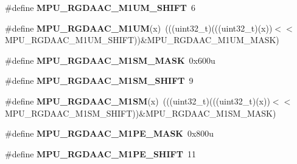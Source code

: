 \begin{DoxyCompactItemize}
\item 
\#define {\bfseries M\+P\+U\+\_\+\+R\+G\+D\+A\+A\+C\+\_\+\+M1\+U\+M\+\_\+\+S\+H\+I\+FT}~6\hypertarget{group__MPU__Register__Masks_gab78a3ecaa69ce9b7a985e4efa7b4620d}{}\label{group__MPU__Register__Masks_gab78a3ecaa69ce9b7a985e4efa7b4620d}

\item 
\#define {\bfseries M\+P\+U\+\_\+\+R\+G\+D\+A\+A\+C\+\_\+\+M1\+UM}(x)~(((uint32\+\_\+t)(((uint32\+\_\+t)(x))$<$$<$M\+P\+U\+\_\+\+R\+G\+D\+A\+A\+C\+\_\+\+M1\+U\+M\+\_\+\+S\+H\+I\+FT))\&M\+P\+U\+\_\+\+R\+G\+D\+A\+A\+C\+\_\+\+M1\+U\+M\+\_\+\+M\+A\+SK)\hypertarget{group__MPU__Register__Masks_ga0d79bb99181801ac26d748c60f15b7eb}{}\label{group__MPU__Register__Masks_ga0d79bb99181801ac26d748c60f15b7eb}

\item 
\#define {\bfseries M\+P\+U\+\_\+\+R\+G\+D\+A\+A\+C\+\_\+\+M1\+S\+M\+\_\+\+M\+A\+SK}~0x600u\hypertarget{group__MPU__Register__Masks_gae1b8caa92c79f5d2c8063322a5648949}{}\label{group__MPU__Register__Masks_gae1b8caa92c79f5d2c8063322a5648949}

\item 
\#define {\bfseries M\+P\+U\+\_\+\+R\+G\+D\+A\+A\+C\+\_\+\+M1\+S\+M\+\_\+\+S\+H\+I\+FT}~9\hypertarget{group__MPU__Register__Masks_gaa7b953ee18610f335e223411d85d8cfa}{}\label{group__MPU__Register__Masks_gaa7b953ee18610f335e223411d85d8cfa}

\item 
\#define {\bfseries M\+P\+U\+\_\+\+R\+G\+D\+A\+A\+C\+\_\+\+M1\+SM}(x)~(((uint32\+\_\+t)(((uint32\+\_\+t)(x))$<$$<$M\+P\+U\+\_\+\+R\+G\+D\+A\+A\+C\+\_\+\+M1\+S\+M\+\_\+\+S\+H\+I\+FT))\&M\+P\+U\+\_\+\+R\+G\+D\+A\+A\+C\+\_\+\+M1\+S\+M\+\_\+\+M\+A\+SK)\hypertarget{group__MPU__Register__Masks_ga4637a5f46bf91983c81b2242ff27c19d}{}\label{group__MPU__Register__Masks_ga4637a5f46bf91983c81b2242ff27c19d}

\item 
\#define {\bfseries M\+P\+U\+\_\+\+R\+G\+D\+A\+A\+C\+\_\+\+M1\+P\+E\+\_\+\+M\+A\+SK}~0x800u\hypertarget{group__MPU__Register__Masks_ga9943b4e0d9ec5824c79a4e8b3bad623c}{}\label{group__MPU__Register__Masks_ga9943b4e0d9ec5824c79a4e8b3bad623c}

\item 
\#define {\bfseries M\+P\+U\+\_\+\+R\+G\+D\+A\+A\+C\+\_\+\+M1\+P\+E\+\_\+\+S\+H\+I\+FT}~11\hypertarget{group__MPU__Register__Masks_ga4e5a6355ee05c02aa02393db9a418318}{}\label{group__MPU__Register__Masks_ga4e5a6355ee05c02aa02393db9a418318}


\end{DoxyCompactItemize}
